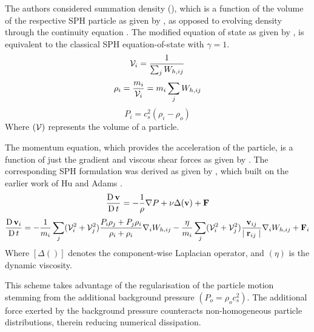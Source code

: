 The authors considered summation density (), which is a function of the volume of the respective SPH particle as given by , as opposed to evolving density through the continuity equation \parencite{hu2006multi}. The modified equation of state as given by , is equivalent to the classical SPH equation-of-state with $\gamma=1$.
\begin{equation}
    \Vol_i = \frac{1}{\sum_j \WIJ}
    \label{eq:Adami2012-vol}
\end{equation}
\begin{equation}
    \rho_i = \frac{m_i}{\Vol_i} = m_i\sum_j \WIJ
    \label{eq:Adami2012-summation-density}
\end{equation}
\begin{equation}
    P_i = c_s^2 (\rho_i - \rho_o)
    \label{eq:Adami2012-eos}
\end{equation}
Where $(\mathcal{V})$ represents the volume of a particle.

The momentum equation, which provides the acceleration of the particle, is a function of just the gradient and viscous shear forces as given by . The corresponding SPH formulation was derived as given by , which built on the earlier work of Hu and Adams \parencite{hu2007incompressible}.
\begin{equation}
    \LagDerivative{\vect{v}} = -\frac{1}{\rho}\nabla P + \nu \Delta( \vect{v} ) + \vect{F}
    \label{eq:Adami2012-mom-governing}
\end{equation}
\begin{equation}
    \LagDerivative{\vect{v}_i} = -\frac{1}{m_i} \sum_j (\Vol^2_i + \Vol^2_j) \frac{P_i \rho_j + P_j \rho_i}{\rho_i + \rho_i} \DWIJ - \frac{\eta}{m_i} \sum_j (\Vol^2_i + \Vol^2_j) \frac{\VIJ}{\RtwoIJ[]}\DWIJ + \vect{F}_i
    \label{eq:Adami2012-mom-sph}
\end{equation}
Where $[\Delta ()]$ denotes the component-wise Laplacian operator, and $(\eta)$ is the dynamic viscosity.

This scheme takes advantage of the regularisation of the
particle motion stemming from the additional background pressure $(P_o = \rho_o c_s^2)$. The additional force exerted by the background pressure counteracts non-homogeneous particle distributions, therein reducing numerical dissipation.

